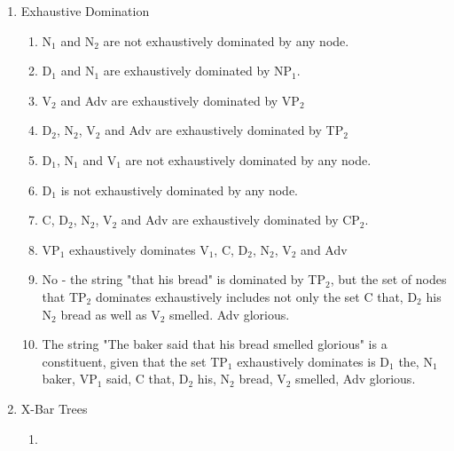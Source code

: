 \documentclass[12pt]{article}
\begin{document}
\begin{enumerate}
\item Exhaustive Domination
\begin{enumerate}[label=\arabic*)]
\item N$_{1}$ and N$_{2}$ are not exhaustively dominated by any node.
\item D$_{1}$ and N$_{1}$ are exhaustively dominated by NP$_{1}$.
\item V$_{2}$ and Adv are exhaustively dominated by VP$_{2}$
\item D$_{2}$, N$_{2}$, V$_{2}$ and Adv are exhaustively dominated by TP$_{2}$
\item D$_{1}$, N$_{1}$ and V$_{1}$ are not exhaustively dominated by any node.
\item D$_{1}$ is not exhaustively dominated by any node.
\item C, D$_{2}$, N$_{2}$, V$_{2}$ and Adv are exhaustively dominated by CP$_{2}$.
\item VP$_{1}$ exhaustively dominates V$_{1}$, C, D$_{2}$, N$_{2}$, V$_{2}$ and Adv
\item No - the string "that his bread" is dominated by TP$_{2}$, but the set of nodes that TP$_{2}$ dominates exhaustively includes not only the set {C that, D$_{2}$ his N$_{2}$ bread} as well as {V$_{2}$ smelled. Adv glorious}.
\item The string "The baker said that his bread smelled glorious" is a constituent, given that the set TP$_{1}$ exhaustively dominates is {D$_{1}$ the, N$_{1}$ baker, VP$_{1}$ said, C that, D$_{2}$ his, N$_{2}$ bread, V$_{2}$ smelled, Adv glorious}.
\end{enumerate}

\newpage
\item X-Bar Trees
\begin{enumerate}
\item \leavevmode\vadjust{\vspace{-\baselineskip}}\newline
\noindent{}


\end{enumerate}
\end{enumerate}
\end{document}
